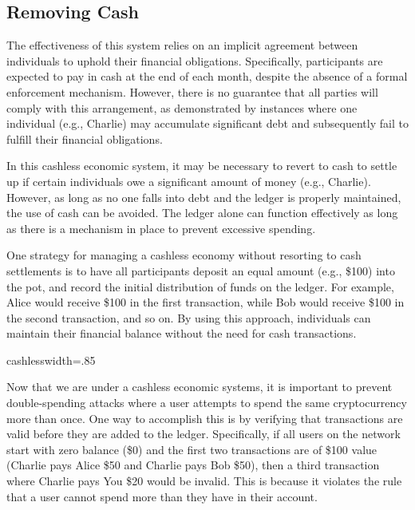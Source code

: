 \subsection{Removing Cash}
The effectiveness of this system relies on an implicit agreement between individuals to uphold their financial obligations. Specifically,
participants are expected to pay in cash at the end of each month, despite the absence of a formal enforcement mechanism. However, there
is no guarantee that all parties will comply with this arrangement, as demonstrated by instances where one individual (e.g., Charlie)
may accumulate significant debt and subsequently fail to fulfill their financial obligations.

In this cashless economic system, it may be necessary to revert to cash to settle up if certain individuals owe a significant amount of
money (e.g., Charlie). However, as long as no one falls into debt and the ledger is properly maintained, the use of cash can be avoided.
The ledger alone can function effectively as long as there is a mechanism in place to prevent excessive spending.

One strategy for managing a cashless economy without resorting to cash settlements is to have all participants deposit an equal amount
(e.g., \$100) into the pot, and record the initial distribution of funds on the ledger. For example, Alice would receive \$100 in the
first transaction, while Bob would receive \$100 in the second transaction, and so on. By using this approach, individuals can maintain
their financial balance without the need for cash transactions.

{cashless}{width=.85\textwidth}%

Now that we are under a cashless economic systems, it is important to prevent double-spending attacks where a user attempts to spend
the same cryptocurrency more than once. One way to accomplish this is by verifying that transactions are valid before they are added
to the ledger. Specifically, if all users on the network start with zero balance (\$0) and the first two transactions are of \$100
value (Charlie pays Alice \$50 and Charlie pays Bob \$50), then a third transaction where Charlie pays You \$20 would be invalid.
This is because it violates the rule that a user cannot spend more than they have in their account.

%

